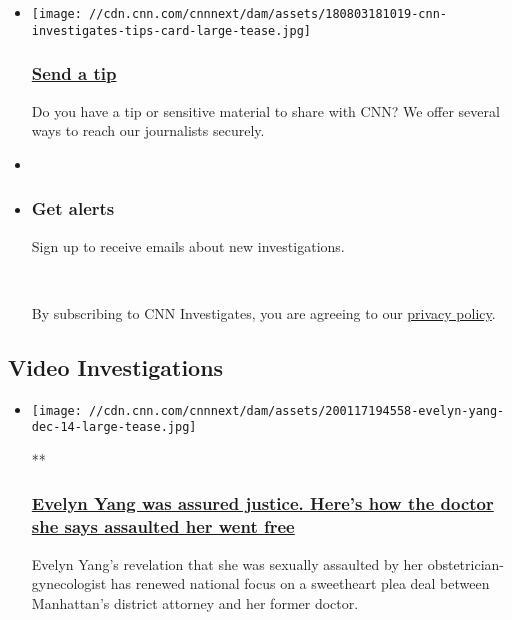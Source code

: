 \begin{itemize}
\item
  \href{https://www.cnn.com/tips}{}

  \texttt{[image: //cdn.cnn.com/cnnnext/dam/assets/180803181019-cnn-investigates-tips-card-large-tease.jpg]}

  \hypertarget{send-a-tip}{%
  \subsubsection{\texorpdfstring{\href{https://www.cnn.com/tips}{Send a
  tip}}{Send a tip}}\label{send-a-tip}}

  Do you have a tip or sensitive material to share with CNN? We offer
  several ways to reach our journalists securely.
\end{itemize}

\begin{itemize}
\item
\item
  \hypertarget{get-alerts}{%
  \subsubsection{Get alerts}\label{get-alerts}}

  Sign up to receive emails about new investigations.

  ~

  By subscribing to CNN Investigates, you are agreeing to our
  \href{https://www.cnn.com/privacy}{privacy policy}.
\end{itemize}

\hypertarget{video-investigations-}{%
\subsection{Video Investigations~}\label{video-investigations-}}

\begin{itemize}
\item
  \href{/videos/us/2020/01/18/evelyn-yang-sexual-assault-part-2-griffin-ebof-vpx.cnn}{}

  \texttt{[image: //cdn.cnn.com/cnnnext/dam/assets/200117194558-evelyn-yang-dec-14-large-tease.jpg]}

  **

  \hypertarget{evelyn-yang-was-assured-justice-heres-how-the-doctor-she-says-assaulted-her-went-free}{%
  \subsubsection{\texorpdfstring{\href{/videos/us/2020/01/18/evelyn-yang-sexual-assault-part-2-griffin-ebof-vpx.cnn}{Evelyn
  Yang was assured justice. Here's how the doctor she says assaulted her
  went
  free}}{Evelyn Yang was assured justice. Here's how the doctor she says assaulted her went free}}\label{evelyn-yang-was-assured-justice-heres-how-the-doctor-she-says-assaulted-her-went-free}}

  Evelyn Yang's revelation that she was sexually assaulted by her
  obstetrician-gynecologist has renewed national focus on a sweetheart
  plea deal between Manhattan's district attorney and her former doctor.
\end{itemize}

